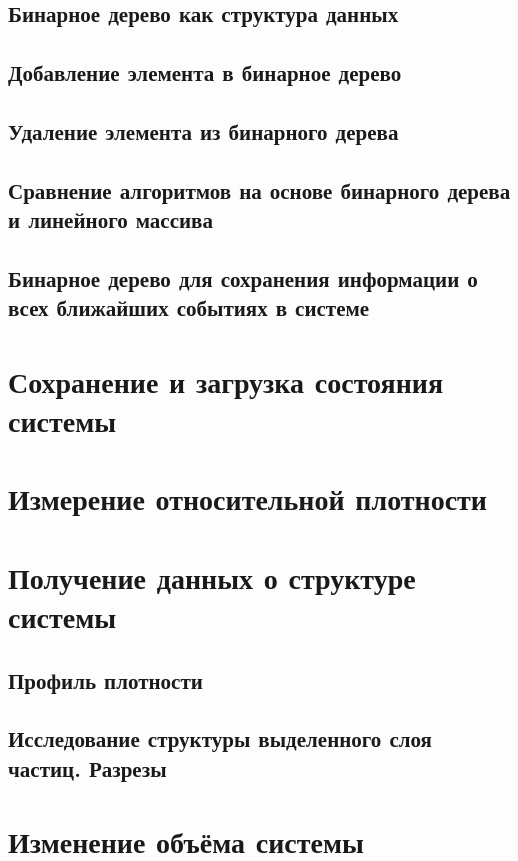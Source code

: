 \documentclass{article}
\begin{document}
\subsection{Бинарное дерево как структура данных}

\subsection{Добавление элемента в бинарное дерево}

\subsection{Удаление элемента из бинарного дерева}

\subsection{Сравнение алгоритмов на основе бинарного дерева и линейного массива}

\subsection{Бинарное дерево для сохранения информации о всех ближайших событиях в системе}


\newpage
\section{Сохранение и загрузка состояния системы}

\newpage
\section{Измерение относительной плотности}

\newpage
\section{Получение данных о структуре системы}
\subsection{Профиль плотности}
\subsection{Исследование структуры выделенного слоя частиц. Разрезы}

\newpage
\section{Изменение объёма системы}
\end{document}

